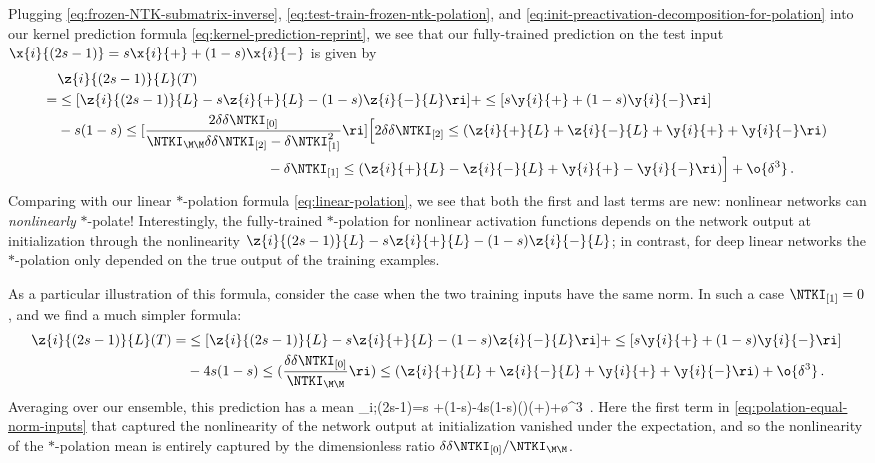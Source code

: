 Plugging \eqref{eq:frozen-NTK-submatrix-inverse}, \eqref{eq:test-train-frozen-ntk-polation}, and \eqref{eq:init-preactivation-decomposition-for-polation} into our kernel prediction formula \eqref{eq:kernel-prediction-reprint}, we see that our fully-trained prediction on the test input $\x{i}{(2s-1)}=s\x{i}{+}+(1-s)\x{i}{-}$ is given by
\begin{align}
&\z{i}{(2s-1)}{L}(T)\, \label{eq:polation-general}\\
=&\le[\z{i}{(2s-1)}{L}-s\z{i}{+}{L}-(1-s)\z{i}{-}{L}\ri]+\le[s \y{i}{+}+(1-s)\y{i}{-}\ri]\, \notag\\
&-s(1-s)\le[\frac{2\delta\delta\NTKI_{[0]}}{\NTKI_{\M\M}\delta\delta\NTKI_{[2]}-\delta\NTKI_{[1]}^2}\ri]\Big[2\delta\delta\NTKI_{[2]}\le(\z{i}{+}{L}+\z{i}{-}{L}+ \y{i}{+}+\y{i}{-}\ri)\, \notag\\
&\quad\quad\quad\quad\quad\quad\quad\quad\quad\quad\quad\quad\quad\quad\quad-\delta\NTKI_{[1]}\le(\z{i}{+}{L}-\z{i}{-}{L}+\y{i}{+}-\y{i}{-}\ri)\Big]+\o{\delta^3}\, .\notag
\end{align}
Comparing with our linear $\ast$-polation formula \eqref{eq:linear-polation}, we see that both the first and last terms are new: nonlinear networks can \emph{nonlinearly} $\ast$-polate!
Interestingly, the fully-trained $\ast$-polation for nonlinear activation functions depends on the network output at initialization through the nonlinearity $\z{i}{(2s-1)}{L}-s\z{i}{+}{L}-(1-s)\z{i}{-}{L}$; in contrast, for deep linear networks the $\ast$-polation only depended on the true output of the training examples. %

As a particular illustration of this formula, consider the case when the two training inputs have the same norm. In such a case $\NTKI_{[1]}=0$, and we find a much simpler formula:
\begin{align}\label{eq:polation-equal-norm-inputs}
\z{i}{(2s-1)}{L}(T)=&\le[\z{i}{(2s-1)}{L}-s\z{i}{+}{L}-(1-s)\z{i}{-}{L}\ri]+\le[s \y{i}{+}+(1-s)\y{i}{-}\ri]\, \\
&-4s(1-s)\le(\frac{\delta\delta\NTKI_{[0]}}{\NTKI_{\M\M}}\ri) \le(\z{i}{+}{L}+\z{i}{-}{L}+ \y{i}{+}+\y{i}{-}\ri)+\o{\delta^3}\, .\notag
\end{align}
Averaging over our ensemble, this prediction has a mean
\be\label{eq:equal-norm-polation-mean}
\GDGPmean_{i;(2s-1)}=s +(1-s)-4s(1-s)\le(\frac{\delta\delta\NTKI_{[0]}}{\NTKI_{\M\M}}\ri)\le(+\ri)+\o{\delta^3}\, .
\ee
Here the first term in \eqref{eq:polation-equal-norm-inputs} that captured the nonlinearity of the network output at initialization vanished under the expectation, and so the nonlinearity of the $\ast$-polation mean is entirely captured by the  dimensionless ratio $\delta\delta\NTKI_{[0]}/\NTKI_{\M\M}$. 



